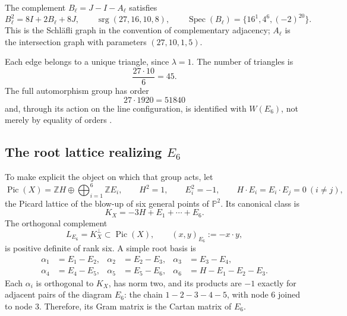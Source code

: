 The complement \(B_\ell=J-I-A_\ell\) satisfies
\begin{equation}
 B_\ell^2=8I+2B_\ell+8J,
 \qquad
 \operatorname{srg}(27,16,10,8),
 \qquad
 \operatorname{Spec}(B_\ell)=\{16^1,4^6,(-2)^{20}\}.
 \label{x_reciprocidad:p12-83-c20-s6:eq:complemento-schlafli}
\end{equation}
This is the Schläfli graph in the convention of complementary adjacency;
\(A_\ell\) is the intersection graph with parameters
\((27,10,1,5)\).

Each edge belongs to a unique triangle, since \(\lambda=1\). The number
of triangles is
\[
 \frac{27\cdot10}{6}=45.
\]
The full automorphism group has order
\[
 27\cdot1920=51840
\]
and, through its action on the line configuration, is identified with
\(W(E_6)\), not merely by equality of orders \cite{x_reciprocidad:Manivel2005}.

\subsection{The root lattice realizing \texorpdfstring{\(E_6\)}{E6}}

To make explicit the object on which that group acts, let
\begin{equation}
 \operatorname{Pic}(X)
 =\mathbb ZH\oplus\bigoplus_{i=1}^6\mathbb ZE_i,
 \qquad
 H^2=1,\qquad E_i^2=-1,\qquad H\cdot E_i=E_i\cdot E_j=0\ (i\ne j),
 \label{x_reciprocidad:p12-83-c20-s6:eq:picard-cubica-e6}
\end{equation}
the Picard lattice of the blow-up of six general points of
\(\mathbb P^2\). Its canonical class is
\[
 K_X=-3H+E_1+\cdots+E_6.
\]
The orthogonal complement
\begin{equation}
 L_{E_6}=K_X^\perp\subset\operatorname{Pic}(X),
 \qquad (x,y)_{E_6}:=-x\cdot y,
 \label{x_reciprocidad:p12-83-c20-s6:eq:reticulo-raices-e6}
\end{equation}
is positive definite of rank six. A simple root basis is
\begin{equation}
 \begin{aligned}
 \alpha_1&=E_1-E_2,& \alpha_2&=E_2-E_3,&
 \alpha_3&=E_3-E_4,\\
 \alpha_4&=E_4-E_5,& \alpha_5&=E_5-E_6,&
 \alpha_6&=H-E_1-E_2-E_3.
 \end{aligned}
 \label{x_reciprocidad:p12-83-c20-s6:eq:raices-simples-e6}
\end{equation}
Each \(\alpha_i\) is orthogonal to \(K_X\), has norm two, and its products
are \(-1\) exactly for adjacent pairs of the diagram
\(E_6\): the chain \(1-2-3-4-5\), with node \(6\) joined to node \(3\).
Therefore, its Gram matrix is the Cartan matrix of \(E_6\).

